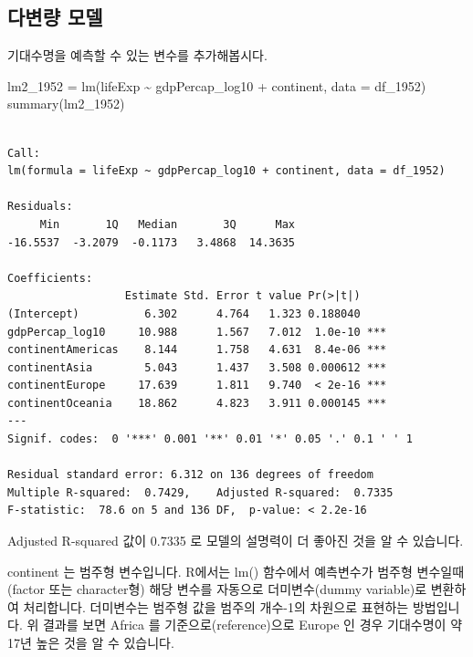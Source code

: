 \documentclass[
  letterpaper,
  DIV=11,
  numbers=noendperiod]{scrartcl}
\newenvironment{Shaded}{\begin{snugshade}}{\end{snugshade}}
\newcommand{\AttributeTok}[1]{\textcolor[rgb]{0.40,0.45,0.13}{#1}}
\newcommand{\FunctionTok}[1]{\textcolor[rgb]{0.28,0.35,0.67}{#1}}
\newcommand{\NormalTok}[1]{\textcolor[rgb]{0.00,0.23,0.31}{#1}}
\newcommand{\OtherTok}[1]{\textcolor[rgb]{0.00,0.23,0.31}{#1}}
\newcommand{\SpecialCharTok}[1]{\textcolor[rgb]{0.37,0.37,0.37}{#1}}
\begin{document}
\hypertarget{uxb2e4uxbcc0uxb7c9-uxbaa8uxb378}{%
\subsection{다변량 모델}\label{uxb2e4uxbcc0uxb7c9-uxbaa8uxb378}}

기대수명을 예측할 수 있는 변수를 추가해봅시다.

\begin{Shaded}
\begin{Highlighting}[]
\NormalTok{lm2\_1952 }\OtherTok{=} \FunctionTok{lm}\NormalTok{(lifeExp }\SpecialCharTok{\textasciitilde{}}\NormalTok{ gdpPercap\_log10 }\SpecialCharTok{+}\NormalTok{ continent, }
             \AttributeTok{data =}\NormalTok{ df\_1952)}
\FunctionTok{summary}\NormalTok{(lm2\_1952)}
\end{Highlighting}
\end{Shaded}

\begin{verbatim}

Call:
lm(formula = lifeExp ~ gdpPercap_log10 + continent, data = df_1952)

Residuals:
     Min       1Q   Median       3Q      Max 
-16.5537  -3.2079  -0.1173   3.4868  14.3635 

Coefficients:
                  Estimate Std. Error t value Pr(>|t|)    
(Intercept)          6.302      4.764   1.323 0.188040    
gdpPercap_log10     10.988      1.567   7.012  1.0e-10 ***
continentAmericas    8.144      1.758   4.631  8.4e-06 ***
continentAsia        5.043      1.437   3.508 0.000612 ***
continentEurope     17.639      1.811   9.740  < 2e-16 ***
continentOceania    18.862      4.823   3.911 0.000145 ***
---
Signif. codes:  0 '***' 0.001 '**' 0.01 '*' 0.05 '.' 0.1 ' ' 1

Residual standard error: 6.312 on 136 degrees of freedom
Multiple R-squared:  0.7429,    Adjusted R-squared:  0.7335 
F-statistic:  78.6 on 5 and 136 DF,  p-value: < 2.2e-16
\end{verbatim}

Adjusted R-squared 값이 0.7335 로 모델의 설명력이 더 좋아진 것을 알 수
있습니다.

continent 는 범주형 변수입니다. R에서는 lm() 함수에서 예측변수가 범주형
변수일때(factor 또는 character형) 해당 변수를 자동으로 더미변수(dummy
variable)로 변환하여 처리합니다. 더미변수는 범주형 값을 범주의 개수-1의
차원으로 표현하는 방법입니다. 위 결과를 보면 Africa 를
기준으로(reference)으로 Europe 인 경우 기대수명이 약 17년 높은 것을 알
수 있습니다.
\end{document}
